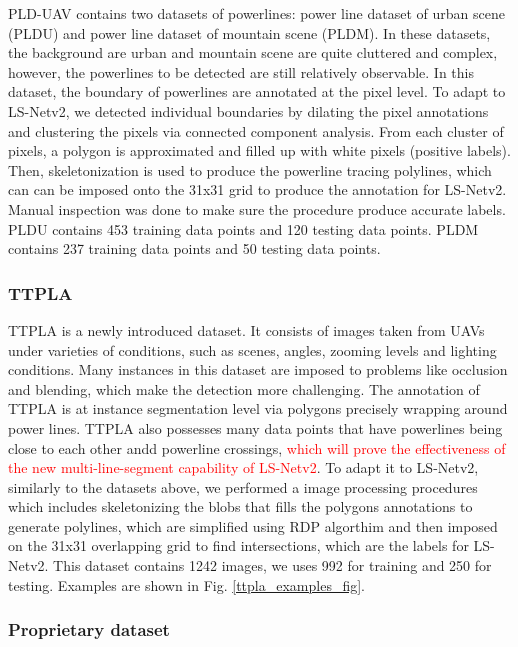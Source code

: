 \documentclass[journal]{IEEEtran}
\begin{document}
PLD-UAV \cite{PLD_UAV} contains two datasets of powerlines: power line dataset of urban scene (PLDU) and power line dataset of mountain scene (PLDM). In these datasets, the background are urban and mountain scene are quite cluttered and complex, however, the powerlines to be detected are still relatively observable. In this dataset, the boundary of powerlines are annotated at the pixel level. To adapt to LS-Netv2, we detected individual boundaries by dilating the pixel annotations and clustering the pixels via connected component analysis. From each cluster of pixels, a polygon is approximated and filled up with white pixels (positive labels). Then, skeletonization is used to produce the powerline tracing polylines, which can can be imposed onto the 31x31 grid to produce the annotation for LS-Netv2. Manual inspection was done to make sure the procedure produce accurate labels. PLDU contains 453 training data points and 120 testing data points. PLDM contains 237 training data points and 50 testing data points.

\subsubsection{TTPLA}

TTPLA \cite{TTPLA} is a newly introduced dataset. It consists of images taken from UAVs under varieties of conditions, such as scenes, angles, zooming levels and lighting conditions. Many instances in this dataset are imposed to problems like occlusion and blending, which make the detection more challenging. The annotation of TTPLA is at instance segmentation level via polygons precisely wrapping around power lines. TTPLA also possesses many data points that have powerlines being close to each other andd powerline crossings, \textcolor{red}{which will prove the effectiveness of the new multi-line-segment capability of LS-Netv2}. To adapt it to LS-Netv2, similarly to the datasets above, we performed a image processing procedures which includes skeletonizing the blobs that fills the polygons annotations to generate polylines, which are simplified using RDP algorthim and then imposed on the 31x31 overlapping grid to find intersections, which are the labels for LS-Netv2. This dataset contains 1242 images, we uses 992 for training and 250 for testing. Examples are shown in Fig. \ref{ttpla_examples_fig}.
\subsubsection{Proprietary dataset}
\end{document}
